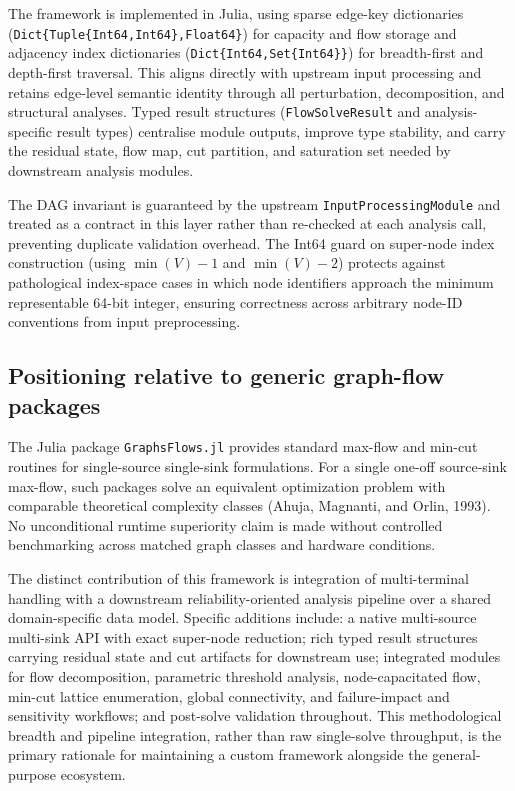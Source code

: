 \documentclass[12pt]{report}
\begin{document}
The framework is implemented in Julia, using sparse edge-key dictionaries (\texttt{Dict\{Tuple\{Int64,Int64\},Float64\}}) for capacity and flow storage and adjacency index dictionaries (\texttt{Dict\{Int64,Set\{Int64\}\}}) for breadth-first and depth-first traversal. This aligns directly with upstream input processing and retains edge-level semantic identity through all perturbation, decomposition, and structural analyses. Typed result structures (\texttt{FlowSolveResult} and analysis-specific result types) centralise module outputs, improve type stability, and carry the residual state, flow map, cut partition, and saturation set needed by downstream analysis modules.

The DAG invariant is guaranteed by the upstream \texttt{InputProcessingModule} and treated as a contract in this layer rather than re-checked at each analysis call, preventing duplicate validation overhead. The Int64 guard on super-node index construction (using $\min(V)-1$ and $\min(V)-2$) protects against pathological index-space cases in which node identifiers approach the minimum representable 64-bit integer, ensuring correctness across arbitrary node-ID conventions from input preprocessing.

\subsection{Positioning relative to generic graph-flow packages}

The Julia package \texttt{GraphsFlows.jl} provides standard max-flow and min-cut routines for single-source single-sink formulations. For a single one-off source-sink max-flow, such packages solve an equivalent optimization problem with comparable theoretical complexity classes (Ahuja, Magnanti, and Orlin, 1993). No unconditional runtime superiority claim is made without controlled benchmarking across matched graph classes and hardware conditions.

The distinct contribution of this framework is integration of multi-terminal handling with a downstream reliability-oriented analysis pipeline over a shared domain-specific data model. Specific additions include: a native multi-source multi-sink API with exact super-node reduction; rich typed result structures carrying residual state and cut artifacts for downstream use; integrated modules for flow decomposition, parametric threshold analysis, node-capacitated flow, min-cut lattice enumeration, global connectivity, and failure-impact and sensitivity workflows; and post-solve validation throughout. This methodological breadth and pipeline integration, rather than raw single-solve throughput, is the primary rationale for maintaining a custom framework alongside the general-purpose ecosystem.
\end{document}
